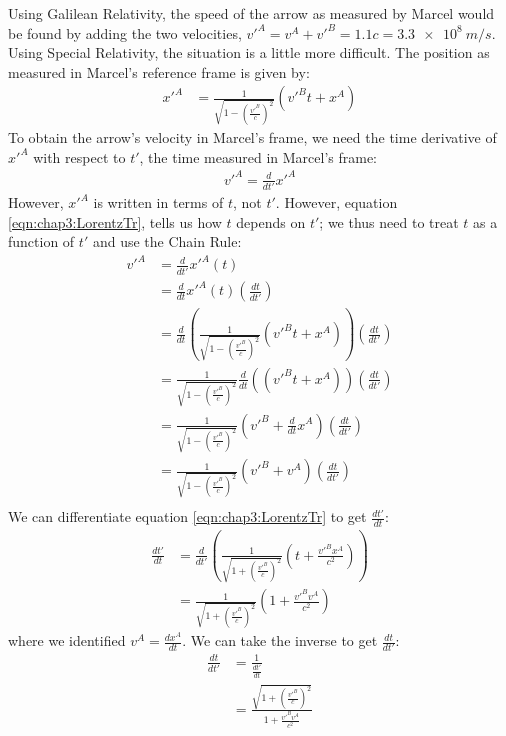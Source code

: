 Using Galilean Relativity, the speed of the arrow as measured by Marcel would be found by adding the two velocities, $v'^A=v^A+v'^B=1.1c=\SI{3.3e8}{m/s}$. Using Special Relativity, the situation is a little more difficult. The position as measured in Marcel's reference frame is given by:
\begin{align*}
x'^A&=\frac{1}{\sqrt{1-\left(\frac{v'^B}{c}\right)^2}}(v'^Bt+x^A)
\end{align*}
To obtain the arrow's velocity in Marcel's frame, we need the time derivative of $x'^A$ with respect to $t'$, the time measured in Marcel's frame:
\begin{align*}
v'^A=\frac{d}{dt'}x'^A
\end{align*}
However, $x'^A$ is written in terms of $t$, not $t'$. However, equation \ref{eqn:chap3:LorentzTr}, tells us how $t$ depends on $t'$; we thus need to treat $t$ as a function of $t'$ and use the Chain Rule:
\begin{align*}
v'^A&=\frac{d}{dt'}x'^A(t)\\
&=\frac{d}{dt}x'^A(t)\left(\frac{dt}{dt'}\right)\\
&=\frac{d}{dt}\left(\frac{1}{\sqrt{1-\left(\frac{v'^B}{c}\right)^2}} (v'^Bt+x^A)  \right)\left(\frac{dt}{dt'}\right)\\
&=\frac{1}{\sqrt{1-\left(\frac{v'^B}{c}\right)^2}}\frac{d}{dt}\left( (v'^Bt+x^A)  \right)\left(\frac{dt}{dt'}\right)\\
&=\frac{1}{\sqrt{1-\left(\frac{v'^B}{c}\right)^2}}\left( v'^B+\frac{d}{dt}x^A \right)\left(\frac{dt}{dt'}\right)\\
&=\frac{1}{\sqrt{1-\left(\frac{v'^B}{c}\right)^2}}\left( v'^B+v^A \right)\left(\frac{dt}{dt'}\right)\\
\end{align*}
We can differentiate equation \ref{eqn:chap3:LorentzTr} to get $\frac{dt'}{dt}$:
\begin{align*}
\frac{dt'}{dt}&=\frac{d}{dt'}\left(\frac{1}{\sqrt{1+\left(\frac{v'^B}{c}\right)^2}}\left(t+\frac{v'^Bx^A}{c^2} \right)\right)\\
&=\frac{1}{\sqrt{1+\left(\frac{v'^B}{c}\right)^2}}\left(1+\frac{v'^Bv^A}{c^2} \right)
\end{align*}
where we identified $v^A=\frac{dx^A}{dt}$. We can take the inverse to get $\frac{dt}{dt'}$:
\begin{align*}
\frac{dt}{dt'}&=\frac{1}{\frac{dt'}{dt}}\\
&=\frac{\sqrt{1+\left(\frac{v'^B}{c}\right)^2}}{1+\frac{v'^Bv^A}{c^2}}
\end{align*}

